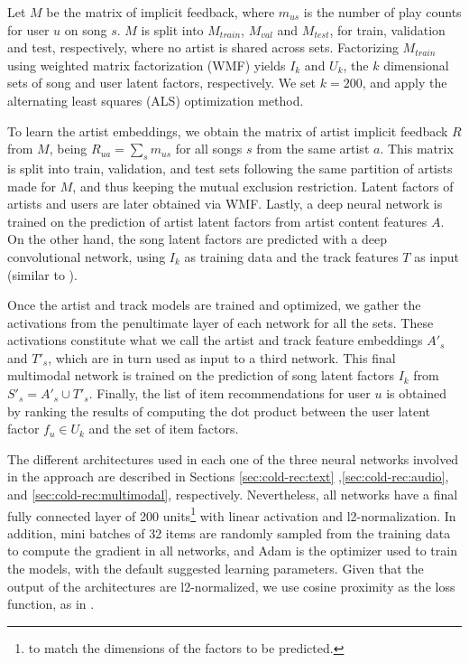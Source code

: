 Let $M$ be the matrix of implicit feedback, where $m_{us}$ is the number of play counts for user $u$ on song $s$. 
$M$ is split into $M_{train}$, $M_{val}$ and $M_{test}$, for train, validation and test, respectively, where no artist is shared across sets. 
Factorizing $M_{train}$ using weighted matrix factorization (WMF) \citep{Hu2008} yields $I_{k}$ and $U_{k}$, the $k$ dimensional sets of song and user latent factors, respectively.
We set $k=200$, and apply the alternating least squares (ALS) optimization method.%


To learn the artist embeddings, we obtain the matrix of artist implicit feedback $R$ from $M$, being $R_{ua} = \sum_{s}m_{us}$ for all songs $s$ from the same artist $a$. This matrix is split into train, validation, and test sets following the same partition of artists made for $M$, and thus keeping the mutual exclusion restriction. 
Latent factors of artists and users are later obtained via WMF. 
Lastly, a deep neural network is trained on the prediction of artist latent factors from artist content features $A$.
On the other hand, the song latent factors are predicted with a deep convolutional network, using $I_{k}$ as training data and the track features $T$ as input (similar to \cite{Oord2013}).

Once the artist and track models are trained and optimized, we gather the activations from the penultimate layer of each network for all the sets. These activations constitute what we call the artist and track feature embeddings $A'_{s}$ and $T'_{s}$, which are in turn used as input to a third network. 
This final multimodal network is trained on the prediction of song latent factors $I_{k}$ from $S'_{s} = A'_{s} \cup T'_{s}$.
Finally, the list of item recommendations for user $u$ is obtained by ranking the results of computing the dot product between the user latent factor $f_{u} \in U_{k}$ and the set of item factors. %


The different architectures used in each one of the three neural networks involved in the approach are described in Sections \ref{sec:cold-rec:text} ,\ref{sec:cold-rec:audio}, and \ref{sec:cold-rec:multimodal}, respectively.
Nevertheless, all networks have a final fully connected layer of 200 units\footnote{to match the dimensions of the factors to be predicted.} with linear activation and l2-normalization. 
In addition, mini batches of 32 items are randomly sampled from the training data to compute the gradient in all networks, and Adam \citep{KingmaB14} is the optimizer used to train the models, with the default suggested learning parameters. 
Given that the output of the architectures are l2-normalized, we use cosine proximity as the loss function, as in \cite{Chollet2016}.

